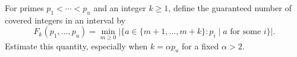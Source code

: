 For primes $p_1<\cdots<p_u$ and an integer $k\geq1$, define the guaranteed number of covered integers in an interval by
\[
F_k(p_1,\ldots,p_u)=\min_{m\geq0}\bigl|\{a\in\{m+1,\ldots,m+k\}:p_i\mid a\text{ for some }i\}\bigr|.
\]
Estimate this quantity, especially when $k=\alpha p_u$ for a fixed $\alpha>2$.
